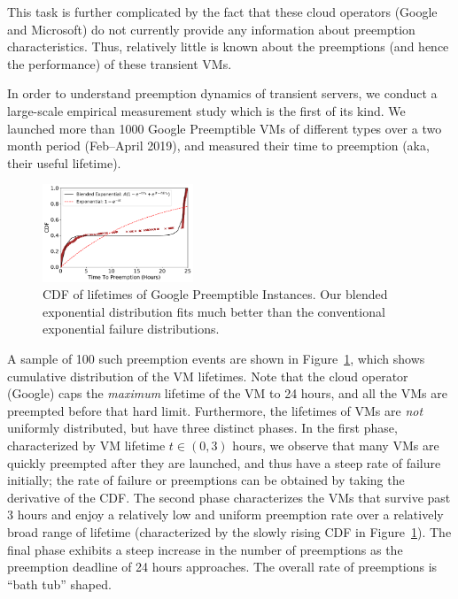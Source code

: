 This task is further complicated by the fact that these cloud operators (Google and Microsoft) do not currently provide any information about preemption characteristics. 
Thus, relatively little is known about the preemptions (and hence the performance) of these transient VMs. %

In order to understand preemption dynamics of transient servers, we conduct a large-scale empirical measurement study which is the first of its kind. 
We launched more than 1000 Google Preemptible VMs of different types over a two month period (Feb--April 2019), and measured their time to preemption (aka, their useful lifetime).\footnotemark



\begin{figure}
  \centering
  \includegraphics[width=0.4\textwidth]{../graphs/cdf_4_all.pdf}
  \caption{CDF of lifetimes of Google Preemptible Instances. Our blended exponential distribution fits much better than the conventional exponential failure distributions. }
  \label{fig:gcp1}
\end{figure}

A sample of 100 such preemption events are shown in Figure~\ref{fig:gcp1}, which shows cumulative distribution of the VM lifetimes. 
Note that the cloud operator (Google) caps the \emph{maximum} lifetime of the VM to 24 hours, and all the VMs are preempted before that hard limit.
Furthermore, the lifetimes of VMs are \emph{not} uniformly distributed, but have three distinct phases. 
In the first phase, characterized by VM lifetime $t\in (0,3)$ hours, we observe that many VMs are quickly preempted after they are launched, and thus have a steep rate of failure initially; the rate of failure or preemptions can be obtained by taking the derivative of the CDF. The second phase characterizes the VMs that survive past 3 hours and enjoy a relatively low and uniform preemption rate over a relatively broad range of lifetime (characterized by the slowly rising CDF in Figure~\ref{fig:gcp1}). The final phase exhibits a steep increase in the number of preemptions as the preemption deadline of 24 hours approaches. The overall rate of preemptions is ``bath tub'' shaped.


